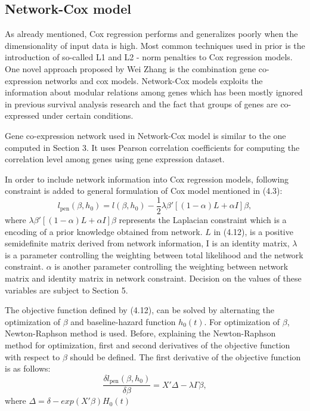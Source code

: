 \documentclass{ba-kecs}
\numberwithin{figure}{section}
\numberwithin{equation}{section}
\begin{document}
\subsection{Network-Cox model}

As already mentioned, Cox regression performs and generalizes poorly when the dimensionality of input data is high. Most common techniques used in prior is the introduction of so-called L1 and L2 - norm penalties to Cox regression models. One novel approach proposed by Wei Zhang \cite{netcox} is the combination gene co-expression networks and cox models. Network-Cox models exploits the information about modular relations among genes which has been mostly ignored in previous survival analysis research and the fact that groups of genes are co-expressed under certain conditions.

Gene co-expression network used in Network-Cox model is similar to the one computed in Section 3. It uses Pearson correlation coefficients for computing the correlation level among genes using gene expression dataset.

In order to include network information into Cox regression models, following constraint is added to general formulation of Cox model mentioned in (4.3):
\begin{equation}
l_\mathrm{pen}(\beta , h_{0}) = l(\beta,h_{0}) - \dfrac{1}{2} \lambda \beta '[(1 - \alpha)L + \alpha{I}]\beta ,
\end{equation}
where $ \lambda \beta '[(1 - \alpha)L + \alpha{I}]\beta $ represents the Laplacian constraint which is a encoding of a prior knowledge obtained from network. $L$ in (4.12), is a positive semidefinite matrix derived from network information, I is an identity matrix, $\lambda$ is a parameter controlling the weighting between total likelihood and the network constraint. $\alpha$ is another parameter controlling the weighting between network matrix and identity matrix in network constraint. Decision on the values of these variables are subject to Section 5.

The objective function defined by (4.12), can be solved by alternating the optimization of $\beta$ and baseline-hazard function $h_{0}(t)$. For optimization of $\beta$, Newton-Raphson method is used. Before, explaining the Newton-Raphson method for optimization, first and second derivatives of the objective function with respect to $\beta$ should be defined. The first derivative of the objective function is as follows:
\begin{equation}
\dfrac{\delta{l_\mathrm{pen}(\beta , h_{0})}}{\delta{\beta}} = X'\Delta - \lambda{\Gamma}\beta ,
\end{equation}
where $\Delta = \delta - exp(X'\beta)H_{0}(t)$
\end{document}
